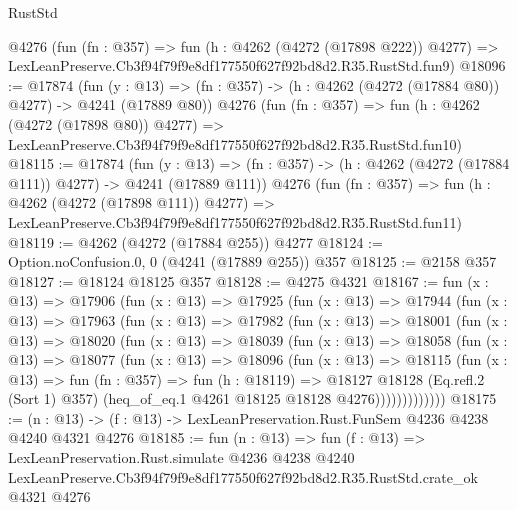 \begin{lexlean}{RustStd}
\begin{coremodule}
    @4276
    (fun (fn : @357) =>
    fun (h : @4262 (@4272 (@17898 @222)) @4277) =>
    LexLeanPreserve.Cb3f94f79f9e8df177550f627f92bd8d2.R35.RustStd.fun9)
@18096 := @17874
    (fun (y : @13) => (fn : @357) -> (h : @4262 (@4272 (@17884 @80)) @4277) -> @4241 (@17889 @80))
    @4276
    (fun (fn : @357) =>
    fun (h : @4262 (@4272 (@17898 @80)) @4277) =>
    LexLeanPreserve.Cb3f94f79f9e8df177550f627f92bd8d2.R35.RustStd.fun10)
@18115 := @17874
    (fun (y : @13) => (fn : @357) -> (h : @4262 (@4272 (@17884 @111)) @4277) -> @4241 (@17889 @111))
    @4276
    (fun (fn : @357) =>
    fun (h : @4262 (@4272 (@17898 @111)) @4277) =>
    LexLeanPreserve.Cb3f94f79f9e8df177550f627f92bd8d2.R35.RustStd.fun11)
@18119 := @4262 (@4272 (@17884 @255)) @4277
@18124 := Option.noConfusion.{0, 0} (@4241 (@17889 @255)) @357
@18125 := @2158 @357
@18127 := @18124 @18125 @357
@18128 := @4275 @4321
@18167 := fun (x : @13) =>
  @17906
    (fun (x : @13) =>
    @17925
      (fun (x : @13) =>
      @17944
        (fun (x : @13) =>
        @17963
          (fun (x : @13) =>
          @17982
            (fun (x : @13) =>
            @18001
              (fun (x : @13) =>
              @18020
                (fun (x : @13) =>
                @18039
                  (fun (x : @13) =>
                  @18058
                    (fun (x : @13) =>
                    @18077
                      (fun (x : @13) =>
                      @18096
                        (fun (x : @13) =>
                        @18115
                          (fun (x : @13) =>
                          fun (fn : @357) =>
                          fun (h : @18119) =>
                          @18127
                            @18128
                            (Eq.refl.{2} (Sort 1) @357)
                            (heq_of_eq.{1} @4261 @18125 @18128 @4276)))))))))))))
@18175 := (n : @13) -> (f : @13) -> LexLeanPreservation.Rust.FunSem @4236 @4238 @4240 @4321 @4276
@18185 := fun (n : @13) =>
  fun (f : @13) =>
  LexLeanPreservation.Rust.simulate
    @4236
    @4238
    @4240
    LexLeanPreserve.Cb3f94f79f9e8df177550f627f92bd8d2.R35.RustStd.crate_ok
    @4321
    @4276
\end{coremodule}
\end{lexlean}
